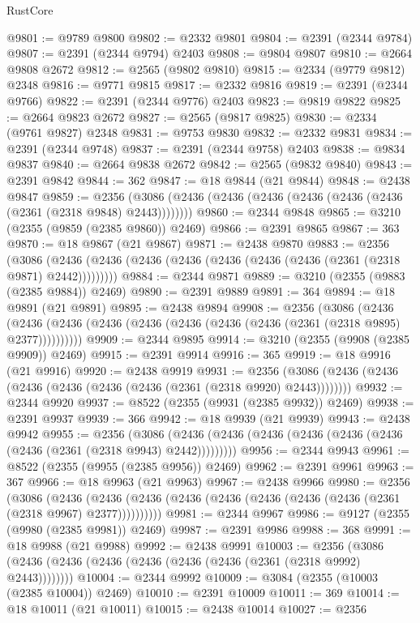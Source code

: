 \begin{lexlean}{RustCore}
\begin{coremodule}
@9801 := @9789 @9800
@9802 := @2332 @9801
@9804 := @2391 (@2344 @9784)
@9807 := @2391 (@2344 @9794) @2403
@9808 := @9804 @9807
@9810 := @2664 @9808 @2672
@9812 := @2565 (@9802 @9810)
@9815 := @2334 (@9779 @9812) @2348
@9816 := @9771 @9815
@9817 := @2332 @9816
@9819 := @2391 (@2344 @9766)
@9822 := @2391 (@2344 @9776) @2403
@9823 := @9819 @9822
@9825 := @2664 @9823 @2672
@9827 := @2565 (@9817 @9825)
@9830 := @2334 (@9761 @9827) @2348
@9831 := @9753 @9830
@9832 := @2332 @9831
@9834 := @2391 (@2344 @9748)
@9837 := @2391 (@2344 @9758) @2403
@9838 := @9834 @9837
@9840 := @2664 @9838 @2672
@9842 := @2565 (@9832 @9840)
@9843 := @2391 @9842
@9844 := 362
@9847 := @18 @9844 (@21 @9844)
@9848 := @2438 @9847
@9859 := @2356 (@3086 (@2436 (@2436 (@2436 (@2436 (@2436 (@2436 (@2361 (@2318 @9848) @2443))))))))
@9860 := @2344 @9848
@9865 := @3210 (@2355 (@9859 (@2385 @9860)) @2469)
@9866 := @2391 @9865
@9867 := 363
@9870 := @18 @9867 (@21 @9867)
@9871 := @2438 @9870
@9883 := @2356
    (@3086 (@2436 (@2436 (@2436 (@2436 (@2436 (@2436 (@2436 (@2361 (@2318 @9871) @2442)))))))))
@9884 := @2344 @9871
@9889 := @3210 (@2355 (@9883 (@2385 @9884)) @2469)
@9890 := @2391 @9889
@9891 := 364
@9894 := @18 @9891 (@21 @9891)
@9895 := @2438 @9894
@9908 := @2356
    (@3086
      (@2436 (@2436 (@2436 (@2436 (@2436 (@2436 (@2436 (@2436 (@2361 (@2318 @9895) @2377))))))))))
@9909 := @2344 @9895
@9914 := @3210 (@2355 (@9908 (@2385 @9909)) @2469)
@9915 := @2391 @9914
@9916 := 365
@9919 := @18 @9916 (@21 @9916)
@9920 := @2438 @9919
@9931 := @2356 (@3086 (@2436 (@2436 (@2436 (@2436 (@2436 (@2436 (@2361 (@2318 @9920) @2443))))))))
@9932 := @2344 @9920
@9937 := @8522 (@2355 (@9931 (@2385 @9932)) @2469)
@9938 := @2391 @9937
@9939 := 366
@9942 := @18 @9939 (@21 @9939)
@9943 := @2438 @9942
@9955 := @2356
    (@3086 (@2436 (@2436 (@2436 (@2436 (@2436 (@2436 (@2436 (@2361 (@2318 @9943) @2442)))))))))
@9956 := @2344 @9943
@9961 := @8522 (@2355 (@9955 (@2385 @9956)) @2469)
@9962 := @2391 @9961
@9963 := 367
@9966 := @18 @9963 (@21 @9963)
@9967 := @2438 @9966
@9980 := @2356
    (@3086
      (@2436 (@2436 (@2436 (@2436 (@2436 (@2436 (@2436 (@2436 (@2361 (@2318 @9967) @2377))))))))))
@9981 := @2344 @9967
@9986 := @9127 (@2355 (@9980 (@2385 @9981)) @2469)
@9987 := @2391 @9986
@9988 := 368
@9991 := @18 @9988 (@21 @9988)
@9992 := @2438 @9991
@10003 := @2356 (@3086 (@2436 (@2436 (@2436 (@2436 (@2436 (@2436 (@2361 (@2318 @9992) @2443))))))))
@10004 := @2344 @9992
@10009 := @3084 (@2355 (@10003 (@2385 @10004)) @2469)
@10010 := @2391 @10009
@10011 := 369
@10014 := @18 @10011 (@21 @10011)
@10015 := @2438 @10014
@10027 := @2356

\end{coremodule}
\end{lexlean}
